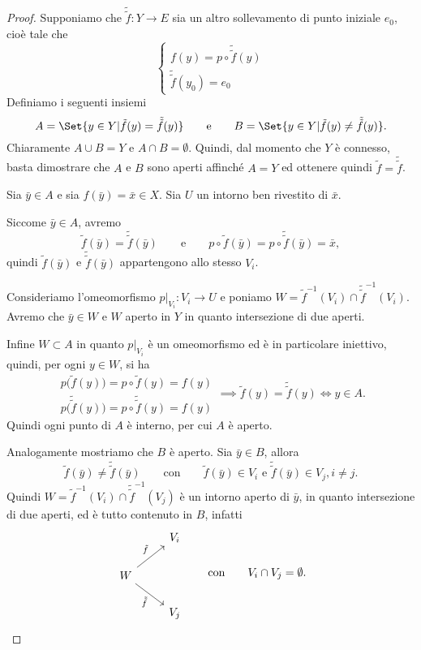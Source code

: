\begin{proof}
	Supponiamo che \(\tilde{\tilde{f}}\colon Y \to E\) sia un altro sollevamento di punto iniziale \(e_0\), cioè tale che
	\[
		\begin{cases}
			f(y) = p\circ \tilde{\tilde{f}}(y) \\
			\tilde{\tilde{f}}(y_0) = e_0
		\end{cases}
	\]
	Definiamo i seguenti insiemi
	\[
		A = \Set{y\in Y | \tilde{f}(y) = \tilde{\tilde{f}}(y)} \qquad\text{e}\qquad B = \Set{y\in Y | \tilde{f}(y)\neq \tilde{\tilde{f}}(y)}.
	\]
	Chiaramente \(A\cup B = Y\) e \(A\cap B = \emptyset\).
	Quindi, dal momento che \(Y\) è connesso, basta dimostrare che \(A\) e \(B\) sono aperti affinché \(A=Y\) ed ottenere quindi \(\tilde{f}=\tilde{\tilde{f}}\).

	Sia \(\bar{y}\in A\) e sia \(f(\bar{y})=\bar{x}\in X\).
	Sia \(U\) un intorno ben rivestito di \(\bar{x}\).

	Siccome \(\bar{y}\in A\), avremo
	\[
		\tilde{f}(\bar{y})=\tilde{\tilde{f}}(\bar{y}) \qquad\text{e}\qquad p\circ \tilde{f}(\bar{y})=p\circ \tilde{\tilde{f}}(\bar{y})=\bar{x},
	\]
	quindi \(\tilde{f}(\bar{y})\) e \(\tilde{\tilde{f}}(\bar{y})\) appartengono allo stesso \(V_i\).

	Consideriamo l'omeomorfismo \(p|_{V_i}\colon V_i \to U\) e poniamo \(W=\tilde{f}^{-1}(V_i)\cap \tilde{\tilde{f}}^{-1}(V_i)\).
	Avremo che \(\bar{y}\in W\) e \(W\) aperto in \(Y\) in quanto intersezione di due aperti.

	Infine \(W\subset A\) in quanto \(p|_{V_i}\) è un omeomorfismo ed è in particolare iniettivo, quindi, per ogni \(y\in W\), si ha
	\[
		\begin{aligned}
			p\big(\tilde{f}(y)\big) = p\circ \tilde{f}(y) = f(y) \\
			p\big(\tilde{\tilde{f}}(y)\big) = p\circ \tilde{\tilde{f}}(y)=f(y)
		\end{aligned}
		\implies \tilde{f}(y) = \tilde{\tilde{f}}(y) \iff y\in A.
	\]
	Quindi ogni punto di \(A\) è interno, per cui \(A\) è aperto.

	Analogamente mostriamo che \(B\) è aperto.
	Sia \(\bar{y}\in B\), allora
	\[
		\tilde{f}(\bar{y}) \neq \tilde{\tilde{f}}(\bar{y}) \qquad\text{con}\qquad \tilde{f}(\bar{y})\in V_i \text{ e }\tilde{\tilde{f}}(\bar{y})\in V_j, i\neq j.
	\]
	Quindi \(W=\tilde{f}^{-1}(V_i)\cap \tilde{\tilde{f}}^{-1}(V_j)\) è un intorno aperto di \(\bar{y}\), in quanto intersezione di due aperti, ed è tutto contenuto in \(B\), infatti
	\[
		\begin{tikzcd}
			& V_i\\
			W \arrow{ur}{\tilde{f}} \arrow[swap]{dr}{\tilde{\tilde{f}}}\\
			& V_j
		\end{tikzcd}
		\qquad\text{con}\qquad V_i \cap V_j = \emptyset.\qedhere
	\]
\end{proof}

